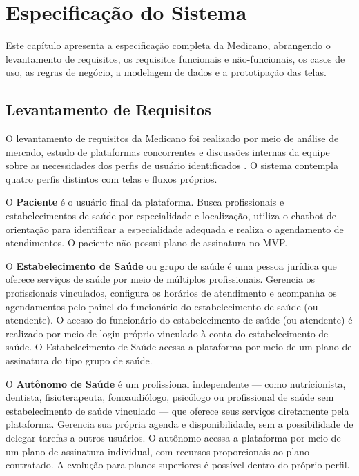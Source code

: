 \chapter{Especificação do Sistema}
\label{chap:specification}

Este capítulo apresenta a especificação completa da
Medicano, abrangendo o levantamento de requisitos,
os requisitos funcionais e não-funcionais, os casos
de uso, as regras de negócio, a modelagem de dados
e a prototipação das telas.

\section{Levantamento de Requisitos}
\label{sec:requirements-gathering}

O levantamento de requisitos da Medicano foi realizado
por meio de análise de mercado, estudo de plataformas
concorrentes e discussões internas da equipe sobre
as necessidades dos perfis de usuário identificados
\cite{sommerville2011}. O sistema contempla quatro
perfis distintos com telas e fluxos próprios.

O \textbf{Paciente} é o usuário final da plataforma.
Busca profissionais e estabelecimentos de saúde por
especialidade e localização, utiliza o chatbot de
orientação para identificar a especialidade adequada
e realiza o agendamento de atendimentos. O paciente
não possui plano de assinatura no MVP.

O \textbf{Estabelecimento de Saúde} ou grupo de saúde é uma pessoa
jurídica que oferece serviços de saúde por meio de
múltiplos profissionais. Gerencia os profissionais
vinculados, configura os horários de atendimento e
acompanha os agendamentos pelo painel do funcionário
do estabelecimento de saúde (ou atendente). O acesso do funcionário
do estabelecimento de saúde (ou atendente) é realizado por meio de
login próprio vinculado à conta do estabelecimento de saúde. O Estabelecimento de Saúde
acessa a plataforma por meio de um plano de assinatura
do tipo grupo de saúde.

O \textbf{Autônomo de Saúde} é um profissional
independente --- como nutricionista, dentista, fisioterapeuta,
fonoaudiólogo, psicólogo ou profissional de saúde sem
estabelecimento de saúde vinculado --- que
oferece seus serviços diretamente pela plataforma.
Gerencia sua própria agenda e disponibilidade, sem
a possibilidade de delegar tarefas a outros usuários.
O autônomo acessa a plataforma por meio de um plano
de assinatura individual, com recursos proporcionais
ao plano contratado. A evolução para planos superiores
é possível dentro do próprio perfil.

